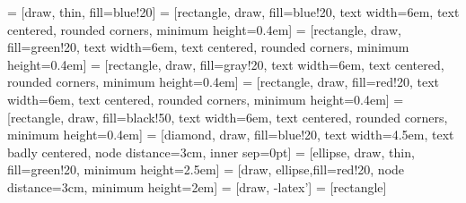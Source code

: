  = [draw, thin, fill=blue!20]
 = [rectangle, draw, fill=blue!20, text width=6em, text centered, rounded corners, minimum height=0.4em]
 = [rectangle, draw, fill=green!20, text width=6em, text centered, rounded corners, minimum height=0.4em]
 = [rectangle, draw, fill=gray!20, text width=6em, text centered, rounded corners, minimum height=0.4em]
 = [rectangle, draw, fill=red!20, text width=6em, text centered, rounded corners, minimum height=0.4em]
 = [rectangle, draw, fill=black!50, text width=6em, text centered, rounded corners, minimum height=0.4em]
 = [diamond, draw, fill=blue!20, text width=4.5em, text badly centered, node distance=3cm, inner sep=0pt]
 = [ellipse, draw, thin, fill=green!20, minimum height=2.5em]
 = [draw, ellipse,fill=red!20, node distance=3cm, minimum height=2em]
 = [draw, -latex']
 = [rectangle]



